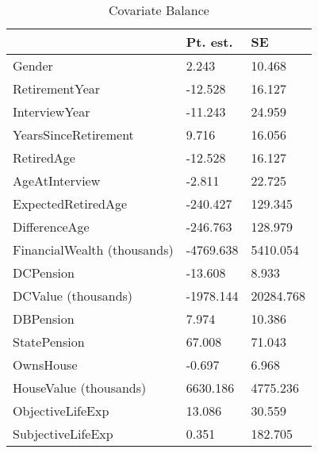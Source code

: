 \begin{table}

\caption{Covariate Balance \label{tab:cov_balance}}
\centering
\begin{tabular}[t]{lll}
\toprule
 & Pt. est. & SE\\
\midrule
Gender & 2.243 & 10.468\\
RetirementYear & -12.528 & 16.127\\
InterviewYear & -11.243 & 24.959\\
YearsSinceRetirement & 9.716 & 16.056\\
RetiredAge & -12.528 & 16.127\\
\addlinespace
AgeAtInterview & -2.811 & 22.725\\
ExpectedRetiredAge & -240.427 & 129.345\\
DifferenceAge & -246.763 & 128.979\\
FinancialWealth (thousands) & -4769.638 & 5410.054\\
DCPension & -13.608 & 8.933\\
\addlinespace
DCValue (thousands) & -1978.144 & 20284.768\\
DBPension & 7.974 & 10.386\\
StatePension & 67.008 & 71.043\\
OwnsHouse & -0.697 & 6.968\\
HouseValue (thousands) & 6630.186 & 4775.236\\
\addlinespace
ObjectiveLifeExp & 13.086 & 30.559\\
SubjectiveLifeExp & 0.351 & 182.705\\
\bottomrule
\end{tabular}
\end{table}
